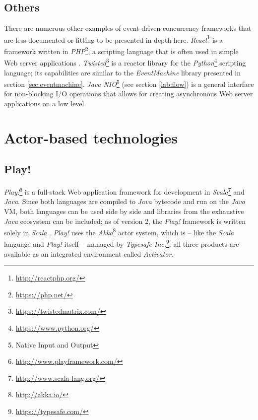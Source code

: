 \subsection{Others}
\label{lab:other-event}
There are numerous other examples of event-driven concurrency frameworks that are less documented or fitting to be presented in depth here. \textit{React}\footnote{\url{http://reactphp.org/}} is a framework written in \textit{PHP}\footnote{\url{https://php.net/}}, a scripting language that is often used in simple Web server applications \cite[p. 36]{Erb2012}. \textit{Twisted}\footnote{\url{https://twistedmatrix.com/}} is a reactor library for the \textit{Python}\footnote{\url{https://www.python.org/}} scripting language; its capabilities are similar to the \textit{EventMachine} library presented in section \ref{sec:eventmachine}. \textit{Java NIO}\footnote{Native Input and Output} (see section \ref{lab:flow}) is a general interface for non-blocking I/O operations that allows for creating asynchronous Web server applications on a low level.

\section{Actor-based technologies}

\subsection{Play!}
\label{lab:play}
\textit{Play!}\footnote{\url{http://www.playframework.com/}} is a full-stack Web application framework for development in \textit{Scala}\footnote{\url{http://www.scala-lang.org/}} and \textit{Java}. Since both languages are compiled to \textit{Java} bytecode and run on the \textit{Java} VM, both languages can be used side by side and libraries from the exhaustive \textit{Java} ecosystem can be included; as of version 2, the \textit{Play!} framework is written solely in \textit{Scala} \cite{Scala}. \textit{Play!} uses the \textit{Akka}\footnote{\url{http://akka.io/}} actor system, which is -- like the \textit{Scala} language and \textit{Play!} itself -- managed by \textit{Typesafe Inc.}\footnote{\url{https://typesafe.com/}}; all three products are available as an integrated environment called \textit{Activator}. 


